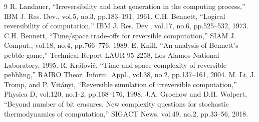\documentclass[a4paper,11pt]{jsarticle}
\theoremstyle{definition}
\begin{document}
\begin{thebibliography}{9}
 R. Landauer, ``Irreversibility and heat generation in the
computing process,'' IBM J. Res. Dev., vol.5, no.3, pp.183--191, 1961.
 C.H. Bennett, ``Logical reversibility of computation,''
IBM J. Res. Dev., vol.17, no.6, pp.525--532, 1973.
 C.H. Bennett, ``Time/space trade-offs for reversible computation,''
SIAM J. Comput., vol.18, no.4, pp.766--776, 1989.
 E. Knill, ``An analysis of Bennett's pebble game,''
Technical Report LAUR-95-2258, Los Alamos National Laboratory, 1995.
 R. Kr\'a\v{l}ovi\v{c}, ``Time and space complexity of reversible pebbling,''
RAIRO Theor. Inform. Appl., vol.38, no.2, pp.137--161, 2004.
 M. Li, J. Tromp, and P. Vit\'anyi, ``Reversible simulation of
irreversible computation,'' Physica D, vol.120, no.1-2, pp.168--176, 1998.
 J.A. Grochow and D.H. Wolpert, ``Beyond number of bit erasures.
New complexity questions for stochastic thermodynamics of computation,''
SIGACT News, vol.49, no.2, pp.33--56, 2018.
\end{thebibliography}
\end{document}

